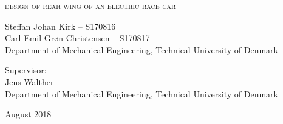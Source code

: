
\begin{titlingpage}

\begin{center}

\vspace*{0cm}
\HUGE
\textsc{design of rear wing of an electric race car}\\
\vspace{1.5cm}

%
\vspace{1.2cm}

\large
{
  Steffan Johan Kirk -- S170816\\
    Carl-Emil Grøn Christensen -- S170817\\
    Department of Mechanical Engineering, Technical University of Denmark
}
\vspace{1.5cm}

{
  Supervisor:\\
  Jens Walther\\
  Department of Mechanical Engineering, Technical University of Denmark
}

\vspace{1.5cm}
{August 2018}\\


\end{center}



\end{titlingpage}

